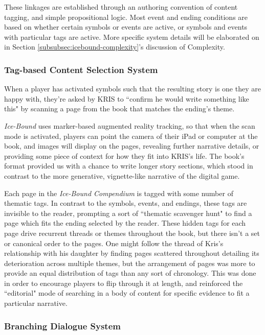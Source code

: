 These linkages are established through an authoring convention of content tagging, and simple propositional logic. Most event and ending conditions are based on whether certain symbols or events are active, or symbols and events with particular tags are active. More specific system details will be elaborated on in Section \ref{subsubsec:icebound-complexity}'s discussion of Complexity.

\subsubsection{Tag-based Content Selection System}\label{subsubsec:tag-based-content-selection-system}

When a player has activated symbols such that the resulting story is one they are happy with, they're asked by KRIS to ``confirm he would write something like this" by scanning a page from the book that matches the ending's theme.

\textit{Ice-Bound} uses marker-based augmented reality tracking, so that when the scan mode is activated, players can point the camera of their iPad or computer at the book, and images will display on the pages, revealing further narrative details, or providing some piece of context for how they fit into KRIS's life. The book's format provided us with a chance to write longer story sections, which stood in contrast to the more generative, vignette-like narrative of the digital game. 

Each page in the \textit{Ice-Bound Compendium} is tagged with some number of thematic tags. In contrast to the symbols, events, and endings, these tags are invisible to the reader, prompting a sort of ``thematic scavenger hunt" to find a page which fits the ending selected by the reader. These hidden tags for each page drive recurrent threads or themes throughout the book, but there isn't a set or canonical order to the pages. One might follow the thread of Kris's relationship with his daughter by finding pages scattered throughout detailing its deterioration across multiple themes, but the arrangement of pages was more to provide an equal distribution of tags than any sort of chronology. This was done in order to encourage players to flip through it at length, and reinforced the ``editorial" mode of searching in a body of content for specific evidence to fit a particular narrative.

\subsubsection{Branching Dialogue System}\label{subsubsec:branching-dialogue-system}

